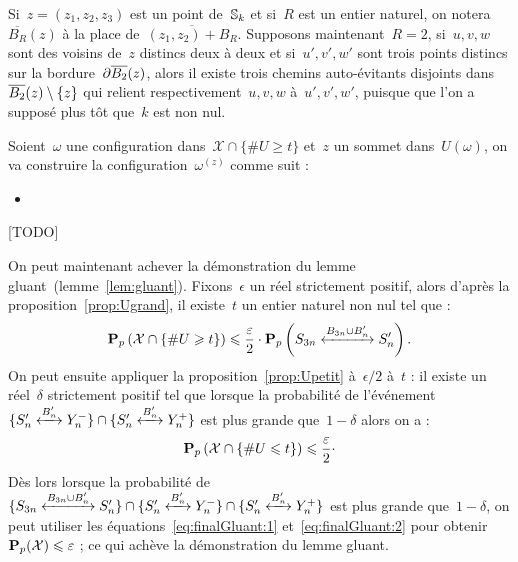 			\begin{rem}
				Si~$z = (z_1, z_2, z_3)$ est un point de~$\mathbb{S}_k$ et si~$R$ est un entier naturel, on notera~$\overline{B_R}(z)$ à la place de~$\overline{(z_1, z_2) + B_R}$. Supposons maintenant~$R=2$, si~$u, v, w$ sont des voisins de~$z$ distincs deux à deux et si~$u', v', w'$ sont trois points distincs sur la bordure~$\partial \overline{B_{2}}(z)$, alors il existe trois chemins auto-évitants disjoints dans~$\overline{B_{2}}(z)\setminus\{z\}$ qui relient respectivement~$u, v, w$ à~$u', v', w'$, puisque que l'on a supposé plus tôt que~$k$ est non nul. 
			\end{rem}
			\begin{dem}
				Soient~$\omega$ une configuration dans~$\mathcal{X}\cap\{\# U \geq t\}$ et~$z$ un sommet dans~$U(\omega)$, on va construire la configuration~$\omega^{(z)}$ comme suit :
				\begin{itemize}
					\item [TODO]
				\end{itemize}
				[TODO]
			\end{dem}
			On peut maintenant achever la démonstration du lemme gluant~(lemme~\ref{lem:gluant}). Fixons~$\epsilon$ un réel strictement positif, alors d'après la proposition~\ref{prop:Ugrand}, il existe~$t$ un entier naturel non nul tel que :
			\begin{equation}\label{eq:finalGluant:1}
					\Pp{\mathcal{X}\cap\{\#U \geq t\}} 
				\leq 
					\frac{\epsilon}{2}
					\cdot
					\Pp{\relie[B_{3n}\cup B_n']{S_{3n}}{S_n'}}.			
			\end{equation}
			On peut ensuite appliquer la proposition~\ref{prop:Upetit} à~$\epsilon/2$ à~$t$ : il existe un réel~$\delta$ strictement positif tel que lorsque la probabilité de l'événement~$\{\relie[B_n']{S_n'}{Y_n^-}\}\cap\{\relie[B_n']{S_n'}{Y_n^+}\}$ est plus grande que~$1-\delta$ alors on a :
			\begin{equation}\label{eq:finalGluant:2}
				\Pp{\mathcal{X}\cap\{\#U\leq t\}}
				\leq
				\frac{\epsilon}{2}
				\cdot %
			\end{equation}
			Dès lors lorsque la probabilité de~$\{\relie[B_{3n}\cup B_n']{S_{3n}}{S_n'}\} \cap \{\relie[B_n']{S_n'}{Y_n^-}\} \cap \{\relie[B_n']{S_n'}{Y_n^+}\}$ est plus grande que~$1-\delta$, on peut utiliser les équations~\ref{eq:finalGluant:1} et~\ref{eq:finalGluant:2} pour obtenir~$\bm{\mathrm{P}}_{p}(\mathcal{X}) \leqslant \varepsilon$ ; ce qui achève la démonstration du lemme gluant.

